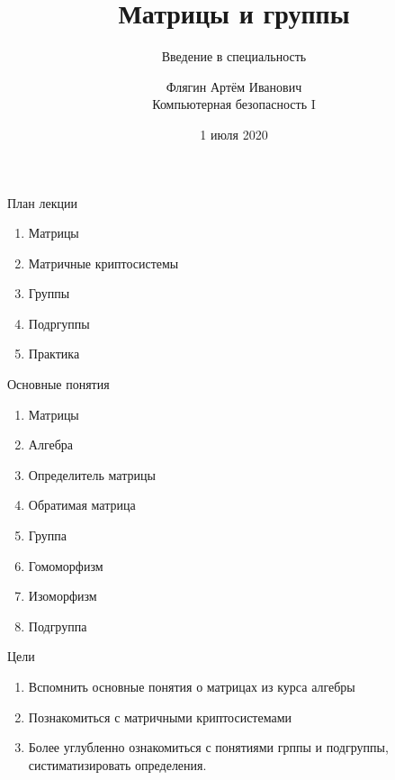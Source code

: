 \documentclass{beamer}
\title{Матрицы и группы}
\subtitle{Введение в специальность}
\institute{БФУ Имени И.Канта ИФМНиИТ}
\author{Флягин Артём Иванович \\
	Компьютерная безопасность I}
\date{1 июля 2020}
\begin{document}
	\frame{\titlepage} 
	\begin{frame}{План лекции}
		\begin{enumerate}
			\item Матрицы
			\item Матричные криптосистемы
			\item Группы
			\item Подргуппы
			\item Практика
		\end{enumerate}
	\end{frame}
	\begin{frame}{Основные понятия}
		\begin{enumerate}
			\item Матрицы
			\item Алгебра
			\item Определитель матрицы
			\item Обратимая матрица
			\item Группа
			\item Гомоморфизм
			\item Изоморфизм
			\item Подгруппа
		\end{enumerate}
	\end{frame}
	\begin{frame}{Цели}
		\begin{enumerate}
			\item Вспомнить основные понятия о матрицах из курса алгебры
			\item Познакомиться с матричными криптосистемами
			\item Более углубленно ознакомиться с понятиями грппы и подгруппы, систиматизировать определения.
		\end{enumerate}
	\end{frame}
\end{document}
